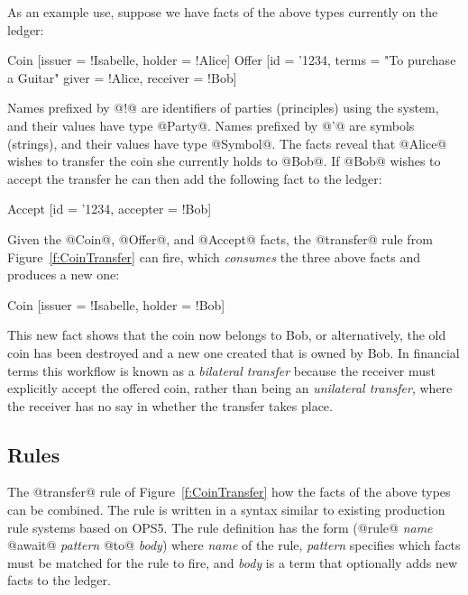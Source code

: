 As an example use, suppose we have facts of the above types currently on the ledger:
\begin{small}
\begin{code}
 Coin   [issuer = !Isabelle, holder = !Alice]
 Offer  [id = '1234, terms = "To purchase a Guitar"
         giver = !Alice, receiver = !Bob]
\end{code}
\end{small}

Names prefixed by @!@ are identifiers of parties (principles) using the system, and their values have type @Party@. Names prefixed by @'@ are symbols (strings), and their values have type @Symbol@. The facts reveal that @Alice@ wishes to transfer the coin she currently holds to @Bob@. If @Bob@ wishes to accept the transfer he can then add the following fact to the ledger:
\begin{small}
\begin{code}
 Accept [id = '1234, accepter = !Bob]
\end{code}
\end{small}

Given the @Coin@, @Offer@, and @Accept@ facts, the @transfer@ rule from Figure~\ref{f:CoinTransfer} can fire, which \emph{consumes} the three above facts and produces a new one:
\begin{small}
\begin{code}
 Coin [issuer = !Isabelle, holder = !Bob]
\end{code}
\end{small}

This new fact shows that the coin now belongs to Bob, or alternatively, the old coin has been destroyed and a new one created that is owned by Bob. In financial terms this workflow is known as a \emph{bilateral transfer} because the receiver must explicitly accept the offered coin, rather than being an \emph{unilateral transfer}, where the receiver has no say in whether the transfer takes place.


\subsection{Rules}
The @transfer@ rule of Figure~\ref{f:CoinTransfer} how the facts of the above types can be combined. The rule is written in a syntax similar to existing production rule systems based on OPS5. The rule definition has the form (@rule@ \emph{name} @await@ \emph{pattern} @to@ \emph{body}) where \emph{name} of the rule, \emph{pattern} specifies which facts must be matched for the rule to fire, and \emph{body} is a term that optionally adds new facts to the ledger.


